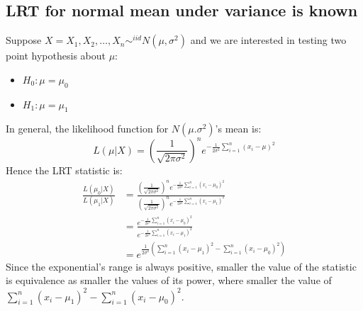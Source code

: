 \documentclass[12pt ]{article}
\begin{document}
\subsection{LRT for normal mean under variance is known}
Suppose $X = X_{1}, X_{2}, \ldots, X_{n} \sim^{iid} N(\mu, \sigma^2)$ and we are interested in testing two point hypothesis about $\mu$:
\begin{itemize}
\item $H_{0}: \mu = \mu_{0}$
\item $H_{1}: \mu = \mu_{1}$
\end{itemize}
In general, the likelihood function for $N(\mu. \sigma^2)$'s mean is: 
\begin{equation*}
L(\mu|X) = (\frac{1}{\sqrt{2 \pi \sigma^2}})^n e^{- \frac{1}{2 \sigma^2} \sum^{n}_{i=1} (x_{i}-\mu)^2}
\end{equation*}
Hence the LRT statistic is:
\begin{align*}
\frac{L(\mu_{0} | X)}{L(\mu_{1} | X)} &= \frac{(\frac{1}{\sqrt{2 \pi \sigma^2}})^n e^{- \frac{1}{2 \sigma^2} \sum^{n}_{i=1} (x_{i}-\mu_{0})^2}}{(\frac{1}{\sqrt{2 \pi \sigma^2}})^n e^{- \frac{1}{2 \sigma^2} \sum^{n}_{i=1} (x_{i}-\mu_{1})^2}} \\
&= \frac{e^{- \frac{1}{2 \sigma^2} \sum^{n}_{i=1} (x_{i}-\mu_{0})^2}}{e^{- \frac{1}{2 \sigma^2} \sum^{n}_{i=1} (x_{i}-\mu_{1})^2}} \\
&= e^{\frac{1}{2 \sigma^2} (\sum^{n}_{i=1} (x_{i}-\mu_{1})^2 - \sum^{n}_{i=1} (x_{i}-\mu_{0})^2)}
\end{align*}
Since the exponential's range is always positive, smaller the value of the statistic is equivalence as smaller the values of its power, where smaller the value of $\sum^{n}_{i=1} (x_{i}-\mu_{1})^2 - \sum^{n}_{i=1} (x_{i}-\mu_{0})^2$. \\
\end{document}
